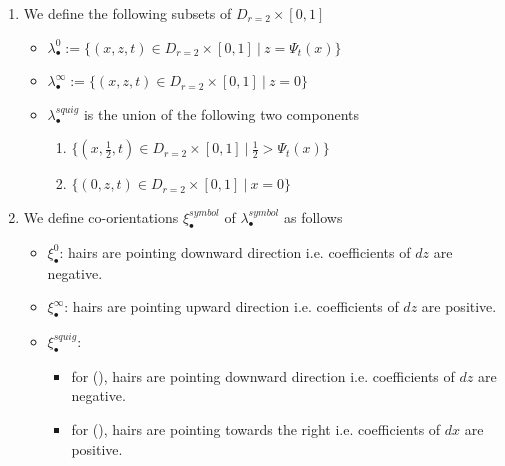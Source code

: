 \begin{definition}
\begin{enumerate}
\item We define the following subsets of $D_{r=2}\times [0,1]$
\begin{itemize}
\item $\lambda_\bullet^0 := \{(x,z,t) \in D_{r=2} \times [0,1] ~|~ z = \Psi_t(x)\}$

\item $\lambda_\bullet^\infty := \{(x,z,t) \in D_{r=2}\times [0,1] ~|~ z = 0 \}$

\item $\lambda_\bullet^{squig}$ is the union of the following two components
\begin{enumerate}[label=(\roman*)]

\item $\{(x,\frac{1}{2},t) \in D_{r=2}\times [0,1] ~|~ \frac{1}{2} > \Psi_t(x) \}$

\item $\{(0,z,t) \in D_{r=2} \times [0,1] ~|~ x=0 \}$
\end{enumerate}
\end{itemize}

\item We define co-orientations $\xi_\bullet^{symbol}$ of $\lambda_\bullet^{symbol}$ as follows
\begin{itemize}
\item $\xi_\bullet^0$: hairs are pointing downward direction i.e. coefficients of $dz$ are negative.

\item $\xi_\bullet^\infty$: hairs are pointing upward direction i.e. coefficients of $dz$ are positive.

\item $\xi_\bullet^{squig}$: 
\begin{itemize}
\item for (), hairs are pointing downward direction i.e. coefficients of $dz$ are negative.

\item for (), hairs are pointing towards the right i.e. coefficients of $dx$ are positive.
\end{itemize}
\end{itemize}
\end{enumerate}
\end{definition}

